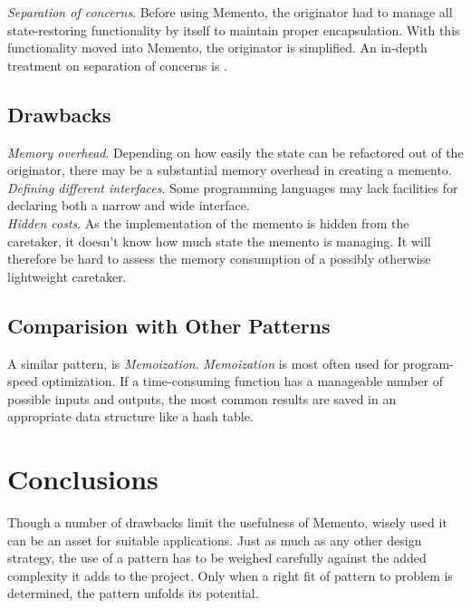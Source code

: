 \documentclass[11pt, a4paper, twoside]{article}
\begin{document}
	\noindent\emph{Separation of concerns}. Before using Memento, the originator had to manage all state-restoring functionality by itself to maintain proper encapsulation. With this functionality moved into Memento, the originator is simplified. An in-depth treatment on separation of concerns is \cite{Huersch95}.
	
	\subsection{Drawbacks}
	\emph{Memory overhead}. Depending on how easily the state can be refactored out of the originator, there may be a substantial memory overhead in creating a memento. \\
	
	\noindent\emph{Defining different interfaces}. Some programming languages may lack facilities for declaring both a narrow and wide interface. \\
	
	\noindent\emph{Hidden costs}. As the implementation of the memento is hidden from the caretaker, it doesn't know how much state the memento is managing. It will therefore be hard to assess the memory consumption of a possibly otherwise lightweight caretaker.
	
	\subsection{Comparision with Other Patterns}
	A similar pattern, is \emph{Memoization}. \emph{Memoization} is most often used for program-speed optimization. If a time-consuming function has a manageable number of possible inputs and outputs, the most common results are saved in an appropriate data structure like a hash table.
	
	\section{Conclusions}
	Though a number of drawbacks limit the usefulness of Memento, wisely used it can be an asset for suitable applications. Just as much as any other design strategy, the use of a pattern has to be weighed carefully against the added complexity it adds to the project. Only when a right fit of pattern to problem is determined, the pattern unfolds its potential.
	
	
	
\end{document}
